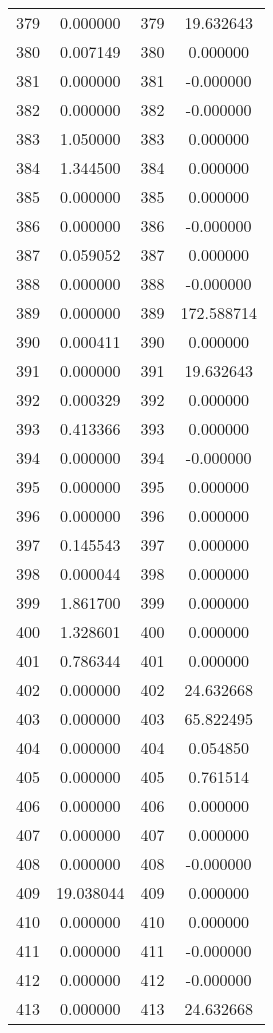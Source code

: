 \documentclass[12pt]{article}
\begin{document}
\begin{longtable}{@{}cccc@{}}
379 & 0.000000 & 379 & 19.632643 \\
380 & 0.007149 & 380 & 0.000000 \\
381 & 0.000000 & 381 & -0.000000 \\
382 & 0.000000 & 382 & -0.000000 \\
383 & 1.050000 & 383 & 0.000000 \\
384 & 1.344500 & 384 & 0.000000 \\
385 & 0.000000 & 385 & 0.000000 \\
386 & 0.000000 & 386 & -0.000000 \\
387 & 0.059052 & 387 & 0.000000 \\
388 & 0.000000 & 388 & -0.000000 \\
389 & 0.000000 & 389 & 172.588714 \\
390 & 0.000411 & 390 & 0.000000 \\
391 & 0.000000 & 391 & 19.632643 \\
392 & 0.000329 & 392 & 0.000000 \\
393 & 0.413366 & 393 & 0.000000 \\
394 & 0.000000 & 394 & -0.000000 \\
395 & 0.000000 & 395 & 0.000000 \\
396 & 0.000000 & 396 & 0.000000 \\
397 & 0.145543 & 397 & 0.000000 \\
398 & 0.000044 & 398 & 0.000000 \\
399 & 1.861700 & 399 & 0.000000 \\
400 & 1.328601 & 400 & 0.000000 \\
401 & 0.786344 & 401 & 0.000000 \\
402 & 0.000000 & 402 & 24.632668 \\
403 & 0.000000 & 403 & 65.822495 \\
404 & 0.000000 & 404 & 0.054850 \\
405 & 0.000000 & 405 & 0.761514 \\
406 & 0.000000 & 406 & 0.000000 \\
407 & 0.000000 & 407 & 0.000000 \\
408 & 0.000000 & 408 & -0.000000 \\
409 & 19.038044 & 409 & 0.000000 \\
410 & 0.000000 & 410 & 0.000000 \\
411 & 0.000000 & 411 & -0.000000 \\
412 & 0.000000 & 412 & -0.000000 \\
413 & 0.000000 & 413 & 24.632668 \\

\end{longtable}
\end{document}
